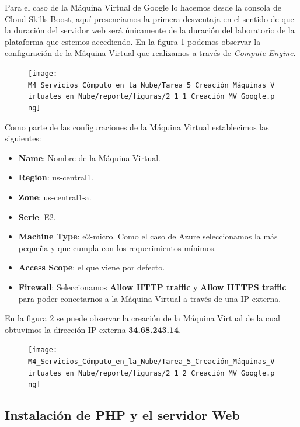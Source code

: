 \documentclass[12pt,a4paper]{article}
\begin{document}
Para el caso de la Máquina Virtual de Google lo hacemos desde la consola de Cloud Skills Boost, aquí presenciamos la primera desventaja en el sentido de que la duración del servidor web será únicamente de la duración del laboratorio de la plataforma que estemos accediendo. En la figura \ref{fig:Google_1} podemos observar la configuración de la Máquina Virtual que realizamos a través de \textit{Compute Engine}.

\begin{figure}[H]
    \centering
    \texttt{[image: M4\_Servicios\_Cómputo\_en\_la\_Nube/Tarea\_5\_Creación\_Máquinas\_Virtuales\_en\_Nube/reporte/figuras/2\_1\_1\_Creación\_MV\_Google.png]}
    \label{fig:Google_1}
\end{figure}

Como parte de las configuraciones de la Máquina Virtual establecimos las siguientes:
\begin{itemize}
    \item \textbf{Name}: Nombre de la Máquina Virtual.
    \item \textbf{Region}: us-central1.
    \item \textbf{Zone}: us-central1-a.
    \item \textbf{Serie}: E2.
    \item \textbf{Machine Type}: e2-micro. Como el caso de Azure seleccionamos la más pequeña y que cumpla con los requerimientos mínimos.
    \item \textbf{Access Scope}: el que viene por defecto.
    \item \textbf{Firewall}: Seleccionamos \textbf{Allow HTTP traffic} y \textbf{Allow HTTPS traffic} para poder conectarnos a la Máquina Virtual a través de una IP externa.
\end{itemize}

En la figura \ref{fig:Google_2} se puede observar la creación de la Máquina Virtual de la cual obtuvimos la dirección IP externa \textbf{34.68.243.14}.

\begin{figure}[H]
    \centering
    \texttt{[image: M4\_Servicios\_Cómputo\_en\_la\_Nube/Tarea\_5\_Creación\_Máquinas\_Virtuales\_en\_Nube/reporte/figuras/2\_1\_2\_Creación\_MV\_Google.png]}
    \label{fig:Google_2}
\end{figure}

\subsection{Instalación de PHP y el servidor Web}
\end{document}
